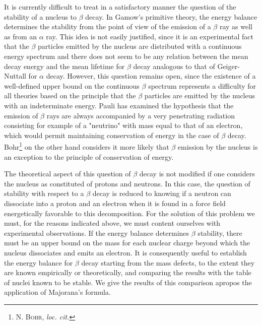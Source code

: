 \documentclass[a4paper,11pt]{article}
\newcommand{\?}[2]{#1\footnote{\textsc{Translator note}: #2}}
\newcommand{\citeauthor}[1]{\textsc{#1}}
\begin{document}
{{It is currently difficult to treat in a satisfactory manner the question of the stability of a nucleus to $\beta$ decay. In Gamow's primitive theory, the energy balance determines the stability from the point of view of the emission of a $\beta$ ray as well as from an $\alpha$ ray. This idea is not easily justified, since it is an experimental fact that the $\beta$ particles emitted by the nucleus are distributed with a continuous energy spectrum and there does not seem to be any relation between the mean decay energy and the mean lifetime for $\beta$ decay analogous to that of Geiger-Nuttall for $\alpha$ decay. However, this question remains open, since the existence of a well-defined upper bound on the continuous $\beta$ spectrum represents a difficulty for all theories based on the principle that the $\beta$ particles are emitted by the nucleus with an indeterminate energy. Pauli has examined the hypothesis that the emission of $\beta$ rays are always accompanied by a very penetrating radiation consisting for example of a "neutrino" with mass equal to that of an electron, which would permit maintaining conservation of energy in the case of $\beta$ decay. Bohr\footnote{\citeauthor{N. Bohr}, \textit{loc. cit.}} on the other hand considers it more likely that $\beta$ emission by the nucleus is an exception to the principle of conservation of energy.

The theoretical aspect of this question of $\beta$ decay is not modified if one considers the nucleus as constituted of protons and neutrons. In this case, the question of stability with respect to a $\beta$ decay is reduced to knowing if a neutron can dissociate into a proton and an electron when it is found in a force field energetically favorable to this decomposition. For the solution of this problem we must, for the reasons indicated above, we must content ourselves with experimental observations. If the energy balance determines $\beta$ stability, there must be an upper bound on the mass for each nuclear charge beyond which the nucleus dissociates and emits an electron. It is consequently useful to establish the energy balance for $\beta$ decay starting from the mass defects, to the extent they are known empirically or theoretically, and comparing the results with the table of nuclei known to be stable. We give the results of this comparison apropos the application of Majorana's formula.

}}
\end{document}
